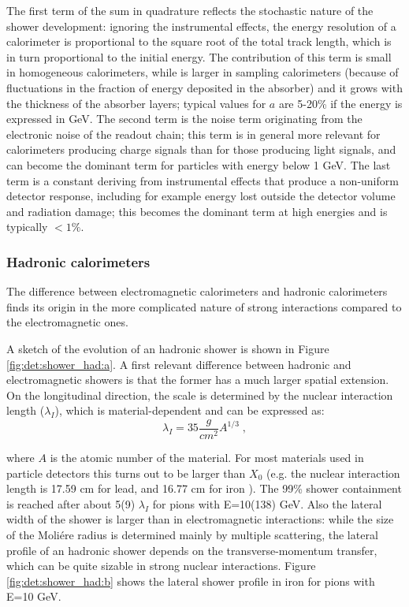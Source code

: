 \noindent The first term of the sum in quadrature reflects the stochastic nature of the shower development: ignoring the instrumental effects, the energy resolution of a calorimeter is proportional to the square root of the total track length, which is in turn proportional to the initial energy. The contribution of this term is small in homogeneous calorimeters, while is larger in sampling calorimeters (because of fluctuations in the fraction of energy deposited in the absorber) and it grows with the thickness of the absorber layers; typical values for $a$ are 5-20\% if the energy is expressed in GeV. The second term is the noise term originating from the electronic noise of the readout chain; this term is in general more relevant for calorimeters producing charge signals than for those producing light signals, and can become the dominant term for particles with energy below 1 GeV. The last term is a constant deriving from instrumental effects that produce a non-uniform detector response, including for example energy lost outside the detector volume and radiation damage; this becomes the dominant term at high energies and is typically $<1\%$. 



\subsubsection*{Hadronic calorimeters}

The difference between electromagnetic calorimeters and hadronic calorimeters finds its origin in the more complicated nature of strong interactions compared to the electromagnetic ones. 

A sketch of the evolution of an hadronic shower is shown in Figure \ref{fig:det:shower_had:a}. A first relevant difference between hadronic and electromagnetic showers is that the former has a much larger spatial extension. On the longitudinal direction, the scale is determined by the nuclear interaction length ($\lambda_I$), which is material-dependent and can be expressed as:
\begin{equation}
\lambda_I = 35 \frac{g}{cm^2} A^{1/3} \; ,
\end{equation}

\noindent where $A$ is the atomic number of the material. For most materials used in particle detectors this turns out to be larger than $X_0$ (e.g. the nuclear interaction length is 17.59 cm for lead, and 16.77 cm for iron \cite{Patrignani:2016xqp}). The 99\% shower containment is reached after about 5(9) $\lambda_I$ for pions with E=10(138) GeV. Also the lateral width of the shower is larger than in electromagnetic interactions: while the size of the Moli\'ere radius is determined mainly by multiple scattering, the lateral profile of an hadronic shower depends on the transverse-momentum transfer, which can be quite sizable in strong nuclear interactions. Figure \ref{fig:det:shower_had:b} shows the lateral shower profile in iron for pions with E=10 GeV.

